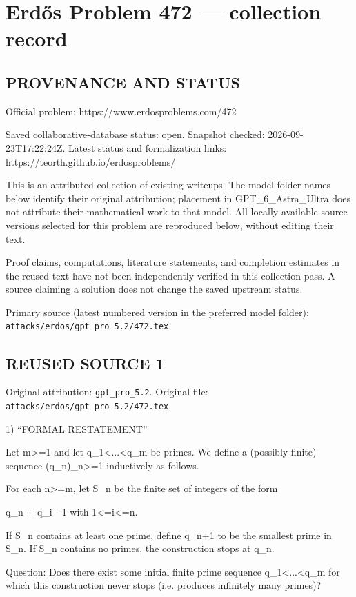 \section*{Erd\H{o}s Problem 472 --- collection record}

\subsection*{PROVENANCE AND STATUS}
Official problem: https://www.erdosproblems.com/472

Saved collaborative-database status: open.
Snapshot checked: 2026-09-23T17:22:24Z.
Latest status and formalization links: https://teorth.github.io/erdosproblems/

This is an attributed collection of existing writeups. The model-folder names below identify their original attribution; placement in GPT\_6\_Astra\_Ultra does not attribute their mathematical work to that model. All locally available source versions selected for this problem are reproduced below, without editing their text.

Proof claims, computations, literature statements, and completion estimates in the reused text have not been independently verified in this collection pass. A source claiming a solution does not change the saved upstream status.

Primary source (latest numbered version in the preferred model folder): \texttt{attacks/erdos/gpt\_pro\_5.2/472.tex}.

\subsection*{REUSED SOURCE 1}
Original attribution: \texttt{gpt\_pro\_5.2}.
Original file: \texttt{attacks/erdos/gpt\_pro\_5.2/472.tex}.


1) “FORMAL RESTATEMENT”

Let m>=1 and let q_1<...<q_m be primes. We define a (possibly finite) sequence (q_n)_{n>=1} inductively as follows.

For each n>=m, let S_n be the finite set of integers of the form

    q_n + q_i - 1  with  1<=i<=n.

If S_n contains at least one prime, define q_{n+1} to be the smallest prime in S_n. If S_n contains no primes, the construction stops at q_n.

Question: Does there exist some initial finite prime sequence q_1<...<q_m for which this construction never stops (i.e. produces infinitely many primes)?

